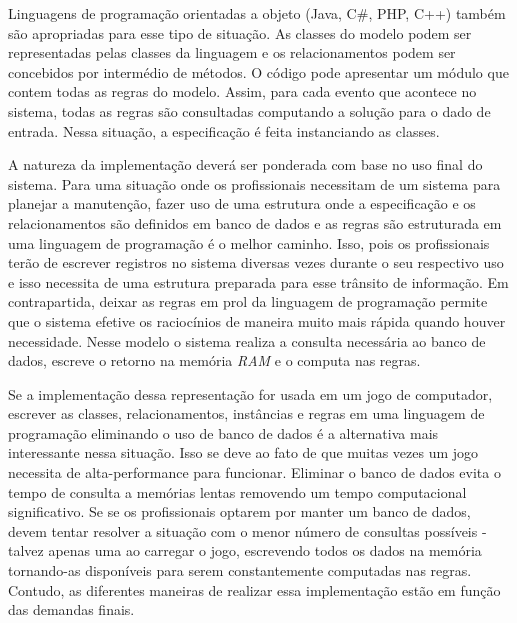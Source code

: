 Linguagens de programação orientadas a objeto (Java, C$\#$, PHP, C++) também são apropriadas para esse tipo de situação. As classes do modelo podem ser representadas pelas classes da linguagem e os relacionamentos podem ser concebidos por intermédio de métodos. O código pode apresentar um módulo que contem todas as regras do modelo. Assim, 
para cada evento que acontece no sistema, todas as regras são consultadas computando a solução para o dado de entrada. Nessa situação, a especificação é feita instanciando as classes. 

A natureza da implementação deverá ser ponderada com base no uso final do sistema. Para uma situação onde os profissionais necessitam de um sistema para planejar a manutenção, fazer uso de uma estrutura onde a especificação e os relacionamentos são definidos em banco de dados e as regras são estruturada em uma linguagem de programação 
é o melhor caminho. Isso, pois os profissionais terão de escrever registros no sistema diversas vezes durante o seu respectivo uso e isso necessita de uma estrutura preparada para esse trânsito de informação. Em contrapartida, deixar as regras em prol da linguagem de programação permite que o sistema efetive os raciocínios de maneira 
muito mais rápida quando houver necessidade. Nesse modelo o sistema realiza a consulta necessária ao banco de dados, escreve o retorno na memória \textit{RAM} e o computa
nas regras. 

Se a implementação dessa representação for usada em um jogo de computador, escrever as classes, relacionamentos, instâncias e regras em uma linguagem de programação eliminando o uso de banco de dados é a alternativa mais interessante nessa situação. Isso se deve ao fato de que muitas vezes um jogo necessita de alta-performance para 
funcionar. Eliminar o banco de dados evita o tempo de consulta a memórias lentas removendo um tempo computacional significativo. Se se os profissionais optarem por manter 
um banco de dados, devem tentar resolver a situação com o menor número de consultas possíveis - talvez apenas uma ao carregar o jogo, escrevendo todos os dados na memória  
tornando-as disponíveis para serem constantemente computadas nas regras. Contudo, as diferentes maneiras de realizar essa implementação estão em função das demandas finais. 